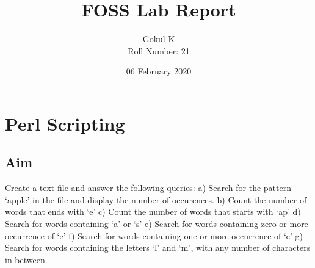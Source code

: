 \documentclass{article}
\begin{document}
\title{FOSS Lab Report}
\author{Gokul K\\[2\baselineskip]
Roll Number: 21\\[2\baselineskip]}
\date{06 February 2020}

\maketitle

\setcounter{section}{14}
\section{Perl Scripting}
\subsection{Aim}
Create a text file and answer the following queries:\newline
	a) Search for the pattern ‘apple’ in the file and display
  the number of occurences.\newline
	b) Count the number of words that ends with ‘e’\newline
	c) Count the number of words that starts with ‘ap’\newline
	d) Search for words containing ‘a’ or ‘s’\newline
	e) Search for words containing zero or more occurrence of ‘e’\newline
	f) Search for words containing one or more occurrence of ‘e’\newline
	g) Search for words containing the letters ‘l’ and ‘m’, with 
	any number of characters in between.
\end{document}
